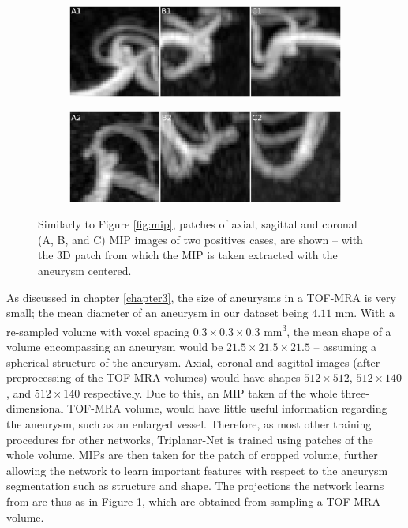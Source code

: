 \begin{figure}[t]
	\centering
	\begin{subfigure}{\linewidth}
		\includegraphics[width=\linewidth]{figures/mip_patch10021.png}
	\end{subfigure}
	\begin{subfigure}{\linewidth}
		\includegraphics[width=\linewidth]{figures/mip_patch10028.png}
	\end{subfigure}
	\caption[Patches of Maximum Intensity Projections of two positive cases.]{Similarly to Figure \ref{fig:mip}, patches of axial, sagittal and coronal (A, B, and C) MIP images of two positives cases, are shown -- with the 3D patch from which the MIP is taken extracted with the aneurysm centered.}
	\label{fig:mip_patch}
\end{figure}


As discussed in chapter \ref{chapter3}, the size of aneurysms in a TOF-MRA is very small; the mean diameter of an aneurysm in our dataset being $4.11$ mm. With a re-sampled volume with voxel spacing $0.3 \times 0.3 \times 0.3$ mm\textsuperscript{3}, the mean shape of a volume encompassing an aneurysm would be $21.5 \times 21.5 \times 21.5$ -- assuming a spherical structure of the aneurysm. Axial, coronal and sagittal images (after preprocessing of the TOF-MRA volumes) would have shapes $512 \times 512$, $512 \times 140$, and $512 \times 140$ respectively. Due to this, an MIP taken of the whole three-dimensional TOF-MRA volume, would have little useful information regarding the aneurysm, such as an enlarged vessel. Therefore, as most other training procedures for other networks, Triplanar-Net is trained using patches of the whole volume. MIPs are then taken for the patch of cropped volume, further allowing the network to learn important features with respect to the aneurysm segmentation such as structure and shape. The projections the network learns from are thus as in Figure \ref{fig:mip_patch}, which are obtained from sampling a TOF-MRA volume. 

